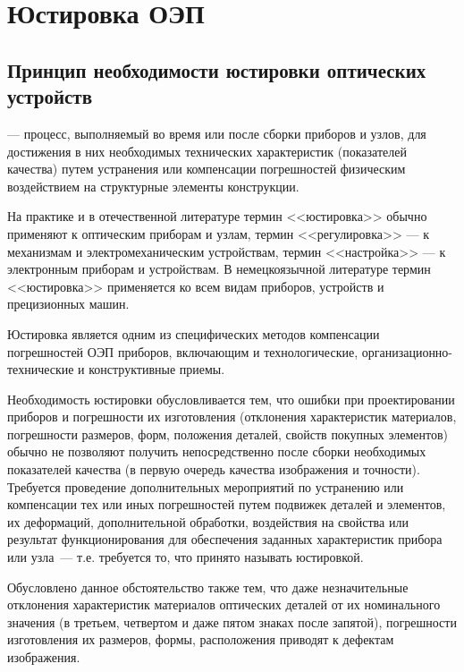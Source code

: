 \chapter{Юстировка ОЭП}
\section[Принцип необходимости юстировки оптических устройств]{Принцип необходимости юстировки оптических\\ устройств}

 --- процесс, выполняемый во время или после сборки приборов и узлов, для достижения в них необходимых технических характеристик (показателей качества) путем устранения или компенсации погрешностей физическим воздействием на структурные элементы конструкции.

На практике и в отечественной литературе термин <<юстировка>> обычно применяют к оптическим приборам и узлам, термин <<регулировка>> --- к механизмам и электромеханическим устройствам, термин <<настройка>> --- к электронным приборам и устройствам. 
В немецкоязычной литературе термин <<юстировка>> применяется ко всем видам приборов, устройств и прецизионных машин.

Юстировка является одним из специфических методов компенсации погрешностей ОЭП приборов, включающим и технологические, организационно-технические и конструктивные приемы.

Необходимость юстировки обусловливается тем, что ошибки при проектировании приборов и погрешности их изготовления (отклонения характеристик материалов, погрешности размеров, форм, положения деталей, свойств покупных элементов) обычно не позволяют получить непосредственно после сборки необходимых показателей качества (в первую очередь качества изображения и точности). 
Требуется проведение дополнительных мероприятий по устранению или компенсации тех или иных погрешностей путем подвижек деталей и элементов, их деформаций, дополнительной обработки, воздействия на свойства или результат функционирования для обеспечения заданных характеристик прибора или узла~--- т.е. требуется то, что принято называть юстировкой.

Обусловлено данное обстоятельство также тем, что даже незначительные отклонения характеристик материалов оптических деталей от их номинального значения (в третьем, четвертом и даже пятом знаках после запятой), погрешности изготовления их размеров, формы, расположения приводят к дефектам изображения.

